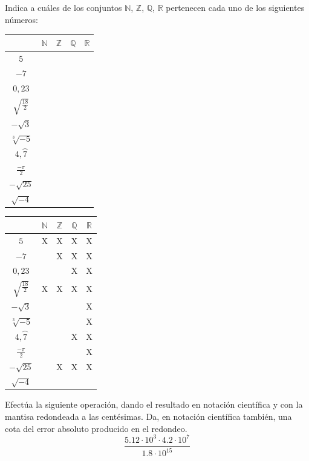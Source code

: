 \documentclass[addpoints,spanish, 12pt,a4paper]{exam}
\begin{document}
\begin{questions}

\question[2] Indica a cuáles de los conjuntos
$\mathbb{N}$, $\mathbb{Z}$, $\mathbb{Q}$, $\mathbb{R}$ pertenecen cada uno de los siguientes números:
\begin{center}
\begin{tabular}{|c |c |c |c |c|}\hline
&$\mathbb{N}$& $\mathbb{Z}$& $\mathbb{Q}$&$\mathbb{R}$\\ 
\hline
$5$&&&&\\
\hline
$-7$&&&&\\
\hline
$0,23$&&&&\\
\hline
$\sqrt{\frac{18}{2}}$&&&&\\
\hline
$-\sqrt{3}$&&&&\\
\hline
$\sqrt[3]{-5}$&&&&\\
\hline
$4,\wideparen{7}$&&&&\\
\hline
$\frac{-\pi}{2}$&&&&\\
\hline
$-\sqrt{25}$&&&&\\
\hline
$\sqrt{-4}$&&&&\\
\hline
\end{tabular}

\end{center}

\begin{solution}
\begin{tabular}{|c |c |c |c |c|}\hline
&$\mathbb{N}$& $\mathbb{Z}$& $\mathbb{Q}$&$\mathbb{R}$\\ 
\hline
$5$&X&X&X&X\\
\hline
$-7$&&X&X&X\\
\hline
$0,23$&&&X&X\\
\hline
$\sqrt{\frac{18}{2}}$&X&X&X&X\\
\hline
$-\sqrt{3}$&&&&X\\
\hline
$\sqrt[3]{-5}$&&&&X\\
\hline
$4,\wideparen{7}$&&&X&X\\
\hline
$\frac{-\pi}{2}$&&&&X\\
\hline
$-\sqrt{25}$&&X&X&X\\
\hline
$\sqrt{-4}$&&&&\\
\hline
\end{tabular}
\end{solution}

\addpoints

\question[2] Efectúa la siguiente operación, dando el resultado en notación científica y con la mantisa redondeada a las centésimas. Da, en notación científica también, una cota del error absoluto producido en el redondeo.
$$\frac{5.12\cdot {10}^3 \cdot 4.2\cdot {10}^7}{1.8 \cdot {10}^{15}}$$
\addpoints %



\end{questions}
\end{document}
